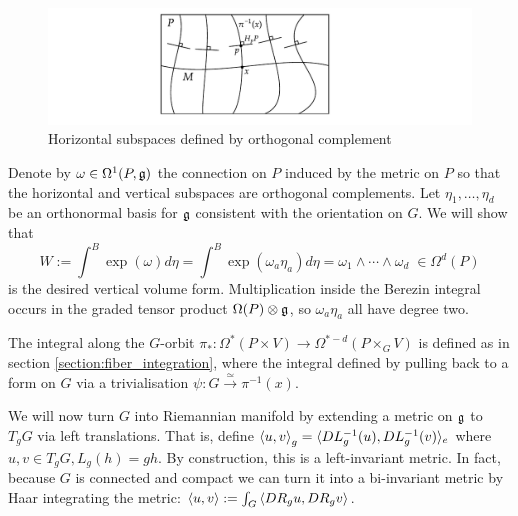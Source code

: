 \begin{figure}[htb]
	\hfill
	\begin{minipage}[c]{0.61\textwidth}
		\includegraphics[trim={45mm 4mm 5cm 2mm},clip,width=\textwidth]{figs/connection_from_metric.pdf}
	\end{minipage} 
	\begin{minipage}[c]{0.38\textwidth}
        \caption{Horizontal subspaces defined by orthogonal complement}
        \label{fig:connection_from_metric}
	\end{minipage} 
\end{figure}
Denote by $\omega \in \Omega^1(P,\operatorname{\mathfrak{g}})$ the connection on
$P$ induced by the metric on $P$ so that the horizontal and
vertical subspaces are orthogonal complements. Let $\eta_1,\ldots,\eta_d$ be an 
orthonormal basis for $\operatorname{\mathfrak{g}}$ consistent with the orientation on $G$.
We will show that
\begin{equation} \label{eq:principal_thom}
W := \int^B \exp(\omega) d\eta 
= \int^B \exp(\omega_a\eta_a) d\eta = \omega_1 \wedge \cdots \wedge\omega_d
\;\in \Omega^d(P)
\end{equation}
is the desired vertical volume form. Multiplication inside the Berezin
integral occurs in the graded tensor product $\Omega(P)\otimes \operatorname{\mathfrak{g}}$, 
so $\omega_a\eta_a$ all have degree two.

The integral along the $G$-orbit 
$\pi_*:\Omega^{*}(P\times V) \to \Omega^{*-d}(P\times_G V)$ is defined as in 
section \ref{section:fiber_integration}, where the integral defined by 
pulling back to a form on $G$ via a trivialisation
$\psi:G\xrightarrow{\simeq} \pi^{-1}(x)$.   

We will now turn $G$ into Riemannian manifold by 
extending a metric on $\operatorname{\mathfrak{g}}$ to $T_gG$ via left translations. That is, define
$\gen{u,v}_g = \gen[*]{DL_g^{-1}(u),DL_g^{-1}(v)}_e$ where $u,v\in T_gG,L_g(h) = gh$.
By construction, this is a left-invariant metric. In fact, because $G$ is
connected and compact we can turn it into a
bi-invariant metric by Haar integrating the metric: $\gen{u,v}:=\int_G
\gen{DR_gu,DR_g v}$.

